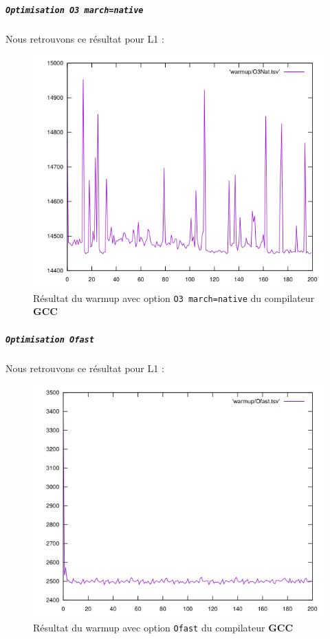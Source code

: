 \documentclass{report}
\begin{document}
    \newpage
\subparagraph{ \texttt{Optimisation O3 march=native}}
  Nous retrouvons ce résultat pour L1 :
  \begin{figure}[ht!]
    \centering
\includegraphics[scale=0.45]{resources/warmup/L1/O3Nat.png}
    \caption{Résultat du warmup avec option \texttt{O3 march=native} du compilateur \textbf{GCC}}
  \end{figure}
  \newpage
\subparagraph{ \texttt{Optimisation Ofast}}
Nous retrouvons ce résultat pour L1 :
\begin{figure}[ht!]
  \centering
\includegraphics[scale=0.45]{resources/warmup/L1/Ofast.png}
  \caption{Résultat du warmup avec option \texttt{Ofast} du compilateur \textbf{GCC}}
\end{figure}
\newpage
\end{document}
